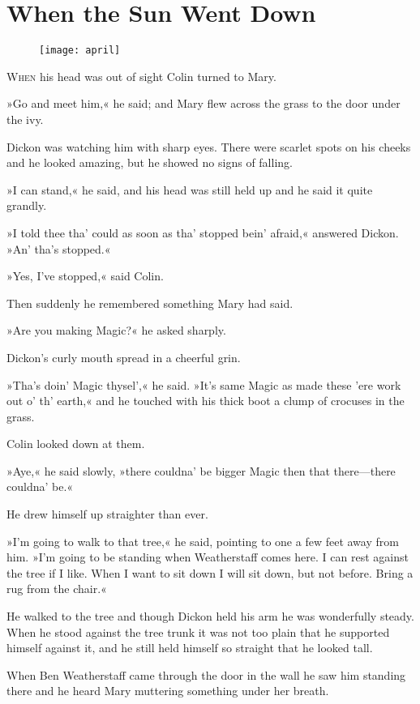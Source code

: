 \chapter{When the Sun Went Down} 
	
\begin{figure}[t!]
\centering
\texttt{[image: april]}
\end{figure}

	\lettrine[lines=6]{W}{hen} his head was out of sight Colin turned to Mary.

\zz
»Go and meet him,« he said; and Mary flew across the grass to the door under the ivy.

\zz
Dickon was watching him with sharp eyes. There were scarlet spots on his cheeks and he looked amazing, but he showed no signs of falling.

»I can stand,« he said, and his head was still held up and he said it quite grandly.

»I told thee tha' could as soon as tha' stopped bein' afraid,« answered Dickon. »An' tha's stopped.«

»Yes, I've stopped,« said Colin.

Then suddenly he remembered something Mary had said.

»Are you making Magic?« he asked sharply.

Dickon's curly mouth spread in a cheerful grin.

»Tha's doin' Magic thysel',« he said. »It's same Magic as made these 'ere work out o' th' earth,« and he touched with his thick boot a clump of crocuses in the grass.

Colin looked down at them.

»Aye,« he said slowly, »there couldna' be bigger Magic then that there—there couldna' be.«

He drew himself up straighter than ever.

»I'm going to walk to that tree,« he said, pointing to one a few feet away from him. »I'm going to be standing when Weatherstaff comes here. I can rest against the tree if I like. When I want to sit down I will sit down, but not before. Bring a rug from the chair.«

He walked to the tree and though Dickon held his arm he was wonderfully steady. When he stood against the tree trunk it was not too plain that he supported himself against it, and he still held himself so straight that he looked tall.

When Ben Weatherstaff came through the door in the wall he saw him standing there and he heard Mary muttering something under her breath.

